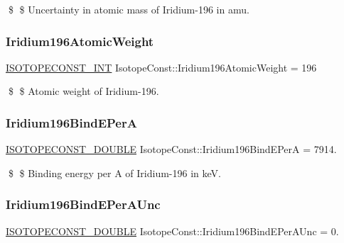 \$ \$ Uncertainty in atomic mass of Iridium-\/196 in amu. \mbox{\label{group___isotope_const-_iridium-_ir196_ga41d4b0502f79d229faaddde0dedd9e88}} 
\subsubsection{\texorpdfstring{Iridium196\+Atomic\+Weight}{Iridium196AtomicWeight}}
{\footnotesize\ttfamily \mbox{\hyperlink{group___isotope_const-_macros_ga5f18360b3e99483a35c32d789e62621c}{I\+S\+O\+T\+O\+P\+E\+C\+O\+N\+S\+T\+\_\+\+I\+NT}} Isotope\+Const\+::\+Iridium196\+Atomic\+Weight = 196}

\$ \$ Atomic weight of Iridium-\/196. \mbox{\label{group___isotope_const-_iridium-_ir196_ga0f96c3753d364c397e3c19b0ca0b58b2}} 
\subsubsection{\texorpdfstring{Iridium196\+Bind\+E\+PerA}{Iridium196BindEPerA}}
{\footnotesize\ttfamily \mbox{\hyperlink{group___isotope_const-_macros_ga8f45a7272ce02c0b4c65c44636ed719a}{I\+S\+O\+T\+O\+P\+E\+C\+O\+N\+S\+T\+\_\+\+D\+O\+U\+B\+LE}} Isotope\+Const\+::\+Iridium196\+Bind\+E\+PerA = 7914.}

\$ \$ Binding energy per A of Iridium-\/196 in keV. \mbox{\label{group___isotope_const-_iridium-_ir196_ga91ed011dd47394a3079f2e8b7025c5dc}} 
\subsubsection{\texorpdfstring{Iridium196\+Bind\+E\+Per\+A\+Unc}{Iridium196BindEPerAUnc}}
{\footnotesize\ttfamily \mbox{\hyperlink{group___isotope_const-_macros_ga8f45a7272ce02c0b4c65c44636ed719a}{I\+S\+O\+T\+O\+P\+E\+C\+O\+N\+S\+T\+\_\+\+D\+O\+U\+B\+LE}} Isotope\+Const\+::\+Iridium196\+Bind\+E\+Per\+A\+Unc = 0.}

